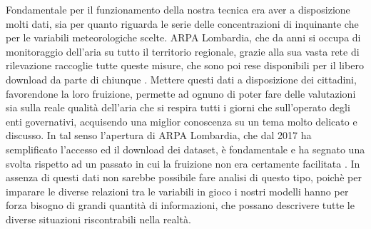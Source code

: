 \documentclass[a4paper]{report}
\begin{document}
Fondamentale per il funzionamento della nostra tecnica era aver a disposizione molti dati, sia per quanto riguarda le serie delle concentrazioni di inquinante che per le variabili meteorologiche scelte. ARPA Lombardia, che da anni si occupa di monitoraggio dell'aria su tutto il territorio regionale, grazie alla sua vasta rete di rilevazione raccoglie tutte queste misure, che sono poi rese disponibili per il libero download
da parte di chiunque \cite{arpa_aria, arpa_meteo}. Mettere questi dati a disposizione dei cittadini, favorendone la loro fruizione, permette ad ognuno di poter fare delle valutazioni sia sulla reale qualità dell'aria che si respira tutti i giorni che sull'operato degli enti governativi, acquisendo una miglior conoscenza su un tema molto delicato e discusso. In tal senso l'apertura di ARPA Lombardia, che dal 2017 ha semplificato l'accesso ed il download dei dataset, è fondamentale e ha segnato una svolta rispetto ad un passato in cui la fruizione non era certamente facilitata \cite{trentini2014lombardy}. 
In assenza di questi dati non sarebbe possibile fare analisi di questo tipo, poichè per imparare le diverse relazioni tra le variabili in gioco i nostri modelli hanno per forza bisogno di grandi quantità di informazioni, che possano descrivere tutte le diverse situazioni riscontrabili nella realtà.
\end{document}
